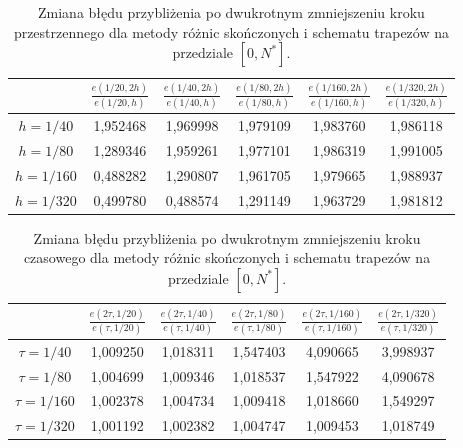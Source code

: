 \documentclass{article}
\begin{document}
		\begin{table}[h!]
			\caption{Zmiana błędu przybliżenia po dwukrotnym zmniejszeniu kroku przestrzennego dla metody różnic skończonych i schematu trapezów na przedziale $[0,N^{*}]$.}
			\centering
			\begin{tabular}{|c|c|c|c|c|c|}
				\hline
				& $\frac{e(1/20,2h)}{e(1/20,h)}$ &  $\frac{e(1/40,2h)}{e(1/40,h)}$ &  $\frac{e(1/80,2h)}{e(1/80,h)}$ &  $\frac{e(1/160,2h)}{e(1/160,h)}$ &  $\frac{e(1/320,2h)}{e(1/320,h)}$ \\
				\hline
				$h=1/40$  &  1,952468 &	1,969998 &	1,979109 &	1,983760 &	1,986118 \\
				\hline
				$h=1/80$  &1,289346 &	1,959261 &	1,977101 &	1,986319 &	1,991005 \\
				\hline
				$h=1/160$ &0,488282 &	1,290807 &	1,961705 &	1,979665 &	1,988937\\
				\hline
				$h=1/320$ &0,499780 &	0,488574 &	1,291149 &	1,963729 &	1,981812 \\
				\hline
			\end{tabular}
		\end{table}
		\begin{table}[h!]
			\caption{Zmiana błędu przybliżenia po dwukrotnym zmniejszeniu kroku czasowego dla metody różnic skończonych i schematu trapezów na przedziale $[0,N^{*}]$.}
			\centering
			\begin{tabular}{|c|c|c|c|c|c|}
				\hline
				& $\frac{{e}(2\tau,1/20)}{e(\tau,1/20)}$ &  $\frac{e(2\tau,1/40)}{e(\tau,1/40)}$ &  $\frac{e(2\tau,1/80)}{e(\tau,1/80)}$ &  $\frac{e(2\tau,1/160)}{e(\tau,1/160)}$ &  $\frac{e(2\tau,1/320)}{e(\tau,1/320)}$ \\
				\hline
				$\tau=1/40$ & 1,009250 & 1,018311 &	1,547403 &	4,090665 &	3,998937 \\
				\hline
				$\tau=1/80$  &1,004699 & 1,009346 &	1,018537 &	1,547922 &	4,090678 \\
				\hline
				$\tau=1/160$ &1,002378 & 1,004734 &	1,009418 &	1,018660 &	1,549297 \\
				\hline
				$\tau=1/320$ &1,001192 & 1,002382 &	1,004747 &	1,009453 &	1,018749 \\
				\hline
			\end{tabular}
		\end{table}
		
\end{document}
